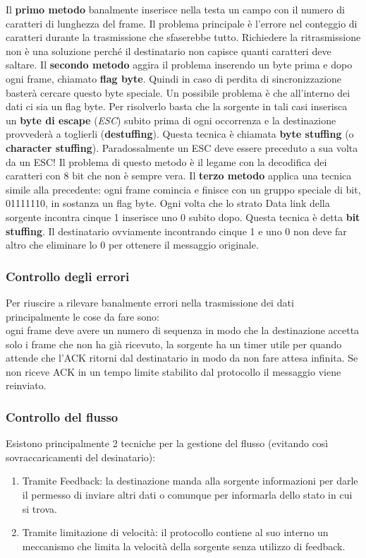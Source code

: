 Il \textbf{primo metodo} banalmente inserisce nella testa un campo con il numero di caratteri di lunghezza del frame. Il problema principale è l'errore nel conteggio di caratteri durante la trasmissione che sfaserebbe tutto. Richiedere la ritrasmissione non è una soluzione perché il destinatario non capisce quanti caratteri deve saltare. Il \textbf{secondo metodo} aggira il problema inserendo un byte prima e dopo ogni frame, chiamato \textbf{flag byte}. Quindi in caso di perdita di sincronizzazione basterà cercare questo byte speciale. Un possibile problema è che all'interno dei dati ci sia un flag byte. Per risolverlo basta che la sorgente in tali casi inserisca un \textbf{byte di escape} (\textit{ESC}) subito prima di ogni occorrenza e la destinazione provvederà a toglierli (\textbf{destuffing}). Questa tecnica è chiamata \textbf{byte stuffing} (o \textbf{character stuffing}). Paradossalmente un ESC deve essere preceduto a sua volta da un ESC! Il problema di questo metodo è il legame con la decodifica dei caratteri con 8 bit che non è sempre vera. Il \textbf{terzo metodo} applica una tecnica simile alla precedente: ogni frame comincia e finisce con un gruppo speciale di bit, 01111110, in sostanza un flag byte. Ogni volta che lo strato Data link della sorgente incontra cinque 1 inserisce uno 0 subito dopo. Questa tecnica è detta \textbf{bit stuffing}. Il destinatario ovviamente incontrando cinque 1 e uno 0 non deve far altro che eliminare lo 0 per ottenere il messaggio originale.

\subsubsection{Controllo degli errori}
Per riuscire a rilevare banalmente errori nella trasmissione dei dati principalmente le cose da fare sono:\\ogni frame deve avere un numero di sequenza in modo che la destinazione accetta solo i frame che non ha già ricevuto, la sorgente ha un timer utile per quando attende che l'ACK ritorni dal destinatario in modo da non fare attesa infinita. Se non riceve ACK in un tempo limite stabilito dal protocollo il messaggio viene reinviato.

\subsubsection{Controllo del flusso}
Esistono principalmente 2 tecniche per la gestione del flusso (evitando così sovraccaricamenti del desinatario):
\begin{enumerate}
\item{Tramite Feedback: la destinazione manda alla sorgente informazioni per darle il permesso di inviare altri dati o comunque per informarla dello stato in cui si trova.}
\item{Tramite limitazione di velocità: il protocollo contiene al suo interno un meccanismo che limita la velocità della sorgente senza utilizzo di feedback.}
\end{enumerate}

